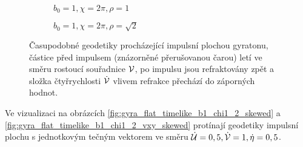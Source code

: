 \begin{figure}[ht]
    \centering
    \begin{subfigure}[b]{0.48\textwidth}
        \caption{$b_0=1, \chi=2\pi, \rho=1$}
    \end{subfigure}
    \begin{subfigure}[b]{0.48\textwidth}
        \caption{$b_0=1, \chi=2\pi, \rho=\sqrt{2}$} 
    \end{subfigure}
    \caption{Časupodobné geodetiky procházející impulsní plochou gyratonu, částice před impulsem (znázorněné přerušovanou čarou)
    letí ve směru rostoucí souřadnice $\mathcal{V}$, po impulsu jsou refraktovány zpět a složka čtyřrychlosti $\dot{\mathcal{V}}$ vlivem refrakce přechází do záporných hodnot.}
    \label{fig:gyra_flat_timelike_b1_chi2_vxy}
\end{figure}

Ve vizualizaci na obrázcích \ref{fig:gyra_flat_timelike_b1_chi1_2_skewed} a \ref{fig:gyra_flat_timelike_b1_chi1_2_vxy_skewed} protínají geodetiky impulsní plochu s jednotkovým tečným vektorem
ve směru $\dot{\mathcal{U}} = 0,5, \dot{\mathcal{V}} = 1, \dot{\eta} = 0,5$.

